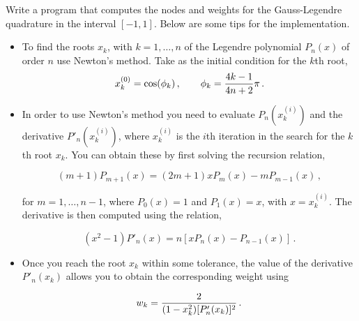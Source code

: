 \begin{exercise}
	Write a program that computes the nodes and weights for the Gauss-Legendre
	quadrature in the interval $[-1,1]$. Below are some tips for the
	implementation.

	\begin{itemize}
		\item To find the roots $x_k$, with $k=1,\ldots,n$ of the Legendre
		      polynomial $P_n(x)$ of order $n$ use Newton's method. Take as the initial
		      condition for the $k$th root,
		      \[
			      x^{(0)}_k=\cos(\phi_k)\,,
			      \qquad
			      \phi_k={4k-1\over 4n+2}\pi\,.
		      \]
		\item In order to use Newton's method you need to evaluate $P_n(x_k^{(i)})$
		      and the derivative $P'_n(x_k^{(i)})$, where $x_k^{(i)}$ is the $i$th
		      iteration in the search for the $k$th root $x_k$. You can obtain these by
		      first solving the recursion relation,

		      \[
			      (m+1)P_{m+1}(x) = (2m+1)xP_{m}(x) - mP_{m-1}(x)\,,
		      \]

		      for $m=1,\ldots,n-1$, where $P_0(x) = 1$ and $P_1(x) = x$, with
		      $x=x^{(i)}_k$. The derivative is then computed using the relation,

		      \[
			      (x^{2}-1)P'_{n}(x)=n[xP_{n}(x)-P_{n-1}(x)]\,.
		      \]

		\item Once you reach the root $x_k$ within some tolerance, the value of the
		      derivative $P'_n(x_k)$ allows you to obtain the corresponding weight using

		      \[
			      w_k= {2\over (1-x_k^2)[P'_n(x_k)]^2}\,.
		      \]
	\end{itemize}

\end{exercise}

